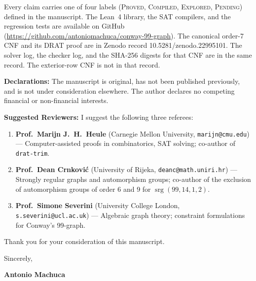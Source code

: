 \documentclass[10pt,a4paper]{article}
\begin{document}
Every claim carries one of four labels (\textsc{Proved}, \textsc{Compiled}, \textsc{Explored}, \textsc{Pending}) defined in the manuscript. The Lean~4 library, the SAT compilers, and the regression tests are available on GitHub (\url{https://github.com/antoniomachuca/conway-99-graph}). The canonical order-7 CNF and its DRAT proof are in Zenodo record 10.5281/zenodo.22995101.
The solver log, the checker log, and the SHA-256 digests for that CNF are in the same record.
The exterior-row CNF is not in that record.

\textbf{Declarations:} The manuscript is original, has not been published previously, and is not under consideration elsewhere. The author declares no competing financial or non-financial interests.

\textbf{Suggested Reviewers:} I suggest the following three referees:
\begin{enumerate}[leftmargin=1.5em, itemsep=0.5pt, topsep=0.5pt]
  \item \textbf{Prof.~Marijn J.~H.~Heule} (Carnegie Mellon University, \texttt{marijn@cmu.edu}) --- Computer-assisted proofs in combinatorics, SAT solving; co-author of \texttt{drat-trim}.
  \item \textbf{Prof.~Dean Crnkovi{\'c}} (University of Rijeka, \texttt{deanc@math.uniri.hr}) --- Strongly regular graphs and automorphism groups; co-author of the exclusion of automorphism groups of order 6 and 9 for $\operatorname{srg}(99,14,1,2)$.
  \item \textbf{Prof.~Simone Severini} (University College London, \texttt{s.severini@ucl.ac.uk}) --- Algebraic graph theory; constraint formulations for Conway's 99-graph.
\end{enumerate}

Thank you for your consideration of this manuscript.

\vspace{0.3em}
Sincerely,

\vspace{0.2em}
\textbf{Antonio Machuca}
\end{document}
